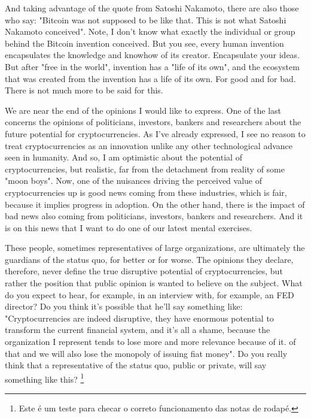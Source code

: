 And taking advantage of the quote from Satoshi Nakamoto, there are also those who say: "Bitcoin was not supposed to be like that. This is not what Satoshi Nakamoto conceived". Note, I don't know what exactly the individual or group behind the Bitcoin invention conceived. But you see, every human invention encapsulates the knowledge and knowhow of its creator. Encapsulate your ideas. But after "free in the world", invention has a "life of its own", and the ecosystem that was created from the invention has a life of its own. For good and for bad. There is not much more to be said for this.

We are near the end of the opinions I would like to express. One of the last concerns the opinions of politicians, investors, bankers and researchers about the future potential for cryptocurrencies. As I've already expressed, I see no reason to treat cryptocurrencies as an innovation unlike any other technological advance seen in humanity. And so, I am optimistic about the potential of cryptocurrencies, but realistic, far from the detachment from reality of some "moon boys". Now, one of the nuisances driving the perceived value of cryptocurrencies up is good news coming from these industries, which is fair, because it implies progress in adoption. On the other hand, there is the impact of bad news also coming from politicians, investors, bankers and researchers. And it is on this news that I want to do one of our latest mental exercises.

These people, sometimes representatives of large organizations, are ultimately the guardians of the status quo, for better or for worse. The opinions they declare, therefore, never define the true disruptive potential of cryptocurrencies, but rather the position that public opinion is wanted to believe on the subject. What do you expect to hear, for example, in an interview with, for example, an FED director? Do you think it's possible that he'll say something like: "Cryptocurrencies are indeed disruptive, they have enormous potential to transform the current financial system, and it's all a shame, because the organization I represent tends to lose more and more relevance because of it. of that and we will also lose the monopoly of issuing fiat money". Do you really think that a representative of the status quo, public or private, will say something like this? \footnote{Este é um teste para checar o correto funcionamento das notas de rodapé.}

